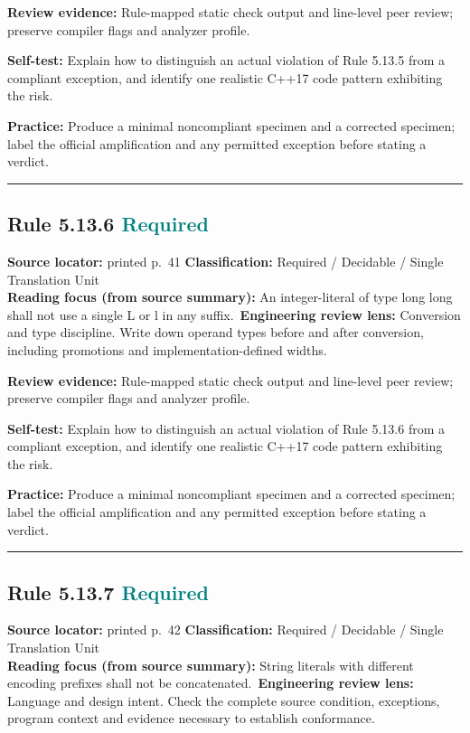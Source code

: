 \documentclass[10pt,letterpaper]{article}
\begin{document}
\textbf{Review evidence:} Rule-mapped static check output and line-level peer review; preserve compiler flags and analyzer profile.

\textbf{Self-test:} Explain how to distinguish an actual violation of Rule 5.13.5 from a compliant exception, and identify one realistic C++17 code pattern exhibiting the risk.\par
\textbf{Practice:} Produce a minimal noncompliant specimen and a corrected specimen; label the official amplification and any permitted exception before stating a verdict.
\smallskip\hrule\smallskip
\subsection*{Rule 5.13.6 \enspace \texorpdfstring{\small\textcolor{teal}{Required}}{Required}}
\noindent\textbf{Source locator:} printed p.~41 \quad\textbf{Classification:} Required / Decidable / Single Translation Unit\\
\textbf{Reading focus (from source summary):} An integer-literal of type long long shall not use a single L or l in any suffix.\
\textbf{Engineering review lens:} Conversion and type discipline. Write down operand types before and after conversion, including promotions and implementation-defined widths.

\textbf{Review evidence:} Rule-mapped static check output and line-level peer review; preserve compiler flags and analyzer profile.

\textbf{Self-test:} Explain how to distinguish an actual violation of Rule 5.13.6 from a compliant exception, and identify one realistic C++17 code pattern exhibiting the risk.\par
\textbf{Practice:} Produce a minimal noncompliant specimen and a corrected specimen; label the official amplification and any permitted exception before stating a verdict.
\smallskip\hrule\smallskip
\subsection*{Rule 5.13.7 \enspace \texorpdfstring{\small\textcolor{teal}{Required}}{Required}}
\noindent\textbf{Source locator:} printed p.~42 \quad\textbf{Classification:} Required / Decidable / Single Translation Unit\\
\textbf{Reading focus (from source summary):} String literals with different encoding prefixes shall not be concatenated.\
\textbf{Engineering review lens:} Language and design intent. Check the complete source condition, exceptions, program context and evidence necessary to establish conformance.
\end{document}
